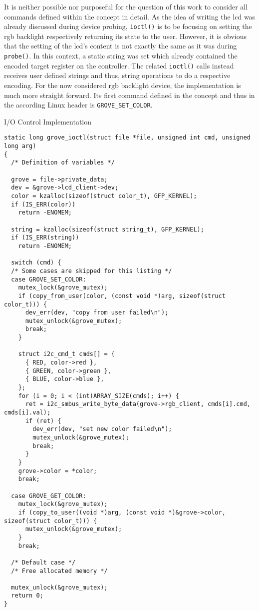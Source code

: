 It is neither possible nor purposeful for the question of this work to consider all commands defined within the concept in detail.
As the idea of writing the \ac{lcd} was already discussed during device probing, \texttt{ioctl()} is to be focusing on setting the \ac{rgb} backlight respectively returning its state to the user.
However, it is obvious that the setting of the \ac{lcd}'s content is not exactly the same as it was during \texttt{probe()}.
In this context, a static string was set which already contained the encoded target register on the controller.
The related \texttt{ioctl()} calls instead receives user defined strings and thus, string operations to do a respective encoding.
For the now considered \ac{rgb} backlight device, the implementation is much more straight forward.
Its first command defined in the concept and thus in the according Linux header is \texttt{GROVE_SET_COLOR}.
%
\begin{listing} [H]
    \caption{I/O Control Implementation}
    \label{lst:ioctl}
    \begin{verbatim}
static long grove_ioctl(struct file *file, unsigned int cmd, unsigned long arg)
{
  /* Definition of variables */

  grove = file->private_data;
  dev = &grove->lcd_client->dev;
  color = kzalloc(sizeof(struct color_t), GFP_KERNEL);
  if (IS_ERR(color))
    return -ENOMEM;

  string = kzalloc(sizeof(struct string_t), GFP_KERNEL);
  if (IS_ERR(string))
    return -ENOMEM;

  switch (cmd) {
  /* Some cases are skipped for this listing */
  case GROVE_SET_COLOR:
    mutex_lock(&grove_mutex);
    if (copy_from_user(color, (const void *)arg, sizeof(struct color_t))) {
      dev_err(dev, "copy from user failed\n");
      mutex_unlock(&grove_mutex);
      break;
    }

    struct i2c_cmd_t cmds[] = {
      { RED, color->red },
      { GREEN, color->green },
      { BLUE, color->blue },
    };
    for (i = 0; i < (int)ARRAY_SIZE(cmds); i++) {
      ret = i2c_smbus_write_byte_data(grove->rgb_client, cmds[i].cmd, cmds[i].val);
      if (ret) {
        dev_err(dev, "set new color failed\n");
        mutex_unlock(&grove_mutex);
        break;
      }
    }   
    grove->color = *color;
    break;

  case GROVE_GET_COLOR:
    mutex_lock(&grove_mutex);
    if (copy_to_user((void *)arg, (const void *)&grove->color, sizeof(struct color_t))) {
      mutex_unlock(&grove_mutex);
    }
    break;

  /* Default case */ 
  /* Free allocated memory */

  mutex_unlock(&grove_mutex);
  return 0;
}
    \end{verbatim}
\end{listing}
